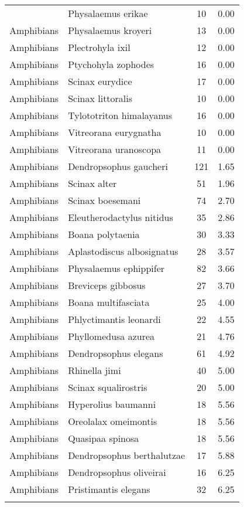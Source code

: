 \begin{longtable}{llcc}
{  Amphibians & Physalaemus erikae &  10 & 0.00 \\ 
  Amphibians & Physalaemus kroyeri &  13 & 0.00 \\ 
  Amphibians & Plectrohyla ixil &  12 & 0.00 \\ 
  Amphibians & Ptychohyla zophodes &  16 & 0.00 \\ 
  Amphibians & Scinax eurydice &  17 & 0.00 \\ 
  Amphibians & Scinax littoralis &  10 & 0.00 \\ 
  Amphibians & Tylototriton himalayanus &  16 & 0.00 \\ 
  Amphibians & Vitreorana eurygnatha &  10 & 0.00 \\ 
  Amphibians & Vitreorana uranoscopa &  11 & 0.00 \\ 
  Amphibians & Dendropsophus gaucheri & 121 & 1.65 \\ 
  Amphibians & Scinax alter &  51 & 1.96 \\ 
  Amphibians & Scinax boesemani &  74 & 2.70 \\ 
  Amphibians & Eleutherodactylus nitidus &  35 & 2.86 \\ 
  Amphibians & Boana polytaenia &  30 & 3.33 \\ 
  Amphibians & Aplastodiscus albosignatus &  28 & 3.57 \\ 
  Amphibians & Physalaemus ephippifer &  82 & 3.66 \\ 
  Amphibians & Breviceps gibbosus &  27 & 3.70 \\ 
  Amphibians & Boana multifasciata &  25 & 4.00 \\ 
  Amphibians & Phlyctimantis leonardi &  22 & 4.55 \\ 
  Amphibians & Phyllomedusa azurea &  21 & 4.76 \\ 
  Amphibians & Dendropsophus elegans &  61 & 4.92 \\ 
  Amphibians & Rhinella jimi &  40 & 5.00 \\ 
  Amphibians & Scinax squalirostris &  20 & 5.00 \\ 
  Amphibians & Hyperolius baumanni &  18 & 5.56 \\ 
  Amphibians & Oreolalax omeimontis &  18 & 5.56 \\ 
  Amphibians & Quasipaa spinosa &  18 & 5.56 \\ 
  Amphibians & Dendropsophus berthalutzae &  17 & 5.88 \\ 
  Amphibians & Dendropsophus oliveirai &  16 & 6.25 \\ 
  Amphibians & Pristimantis elegans &  32 & 6.25 \\ 
}
\end{longtable}
